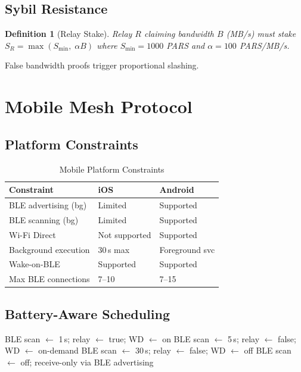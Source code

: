 \documentclass[11pt,a4paper]{article}
\newtheorem{definition}{Definition}[section]
\begin{document}
\subsection{Sybil Resistance}

\begin{definition}[Relay Stake]
    Relay $R$ claiming bandwidth $B$ (MB/s) must stake
    $S_R = \max(S_{\min},\; \alpha B)$
    where $S_{\min} = 1000$ PARS and $\alpha = 100$ PARS/MB/s.
\end{definition}

False bandwidth proofs trigger proportional slashing.

\section{Mobile Mesh Protocol}
\label{sec:mobile}

\subsection{Platform Constraints}

\begin{table}[h]
\centering
\caption{Mobile Platform Constraints}
\label{tab:mobile-constraints}
\begin{tabular}{@{}lll@{}}
\toprule
\textbf{Constraint}         & \textbf{iOS}      & \textbf{Android} \\
\midrule
BLE advertising (bg)        & Limited            & Supported \\
BLE scanning (bg)           & Limited            & Supported \\
Wi-Fi Direct                & Not supported      & Supported \\
Background execution        & 30\,s max          & Foreground svc \\
Wake-on-BLE                 & Supported          & Supported \\
Max BLE connections         & 7--10              & 7--15 \\
\bottomrule
\end{tabular}
\end{table}

\subsection{Battery-Aware Scheduling}

\begin{algorithm}[H]
\caption{Battery-Aware Mesh Scheduling}
\label{alg:battery}
\begin{algorithmic}[1]
        \State BLE scan $\gets$ 1\,s;\; relay $\gets$ true;\; WD $\gets$ on
        \State BLE scan $\gets$ 5\,s;\; relay $\gets$ false;\; WD $\gets$ on-demand
        \State BLE scan $\gets$ 30\,s;\; relay $\gets$ false;\; WD $\gets$ off
    \Else
        \State BLE scan $\gets$ off;\; receive-only via BLE advertising
    \EndIf
\EndFunction
\end{algorithmic}
\end{algorithm}
\end{document}

